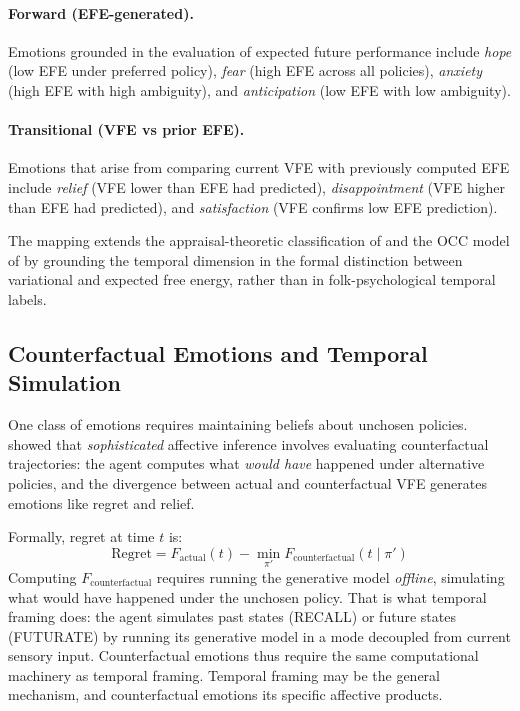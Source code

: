 \documentclass[11pt,a4paper]{article}
\begin{document}
\paragraph{Forward (EFE-generated).} Emotions grounded in the evaluation of expected future performance include \emph{hope} (low EFE under preferred policy), \emph{fear} (high EFE across all policies), \emph{anxiety} (high EFE with high ambiguity), and \emph{anticipation} (low EFE with low ambiguity).

\paragraph{Transitional (VFE vs prior EFE).} Emotions that arise from comparing current VFE with previously computed EFE include \emph{relief} (VFE lower than EFE had predicted), \emph{disappointment} (VFE higher than EFE had predicted), and \emph{satisfaction} (VFE confirms low EFE prediction).

The mapping extends the appraisal-theoretic classification of \citet{smith1985patterns} and the OCC model of \citet{ortony1988cognitive} by grounding the temporal dimension in the formal distinction between variational and expected free energy, rather than in folk-psychological temporal labels.





\subsection{Counterfactual Emotions and Temporal Simulation}\label{sec:counterfactual_emotions}

One class of emotions requires maintaining beliefs about unchosen policies. \citet{hesp2020sophisticated} showed that \emph{sophisticated} affective inference involves evaluating counterfactual trajectories: the agent computes what \emph{would have} happened under alternative policies, and the divergence between actual and counterfactual VFE generates emotions like regret and relief.

Formally, regret at time $t$ is:
\begin{equation}
    \text{Regret} = F_{\text{actual}}(t) - \min_{\pi'} F_{\text{counterfactual}}(t \mid \pi')
\end{equation}
Computing $F_{\text{counterfactual}}$ requires running the generative model \emph{offline}, simulating what would have happened under the unchosen policy. That is what temporal framing does: the agent simulates past states (RECALL) or future states (FUTURATE) by running its generative model in a mode decoupled from current sensory input. Counterfactual emotions thus require the same computational machinery as temporal framing. Temporal framing may be the general mechanism, and counterfactual emotions its specific affective products.
\end{document}
